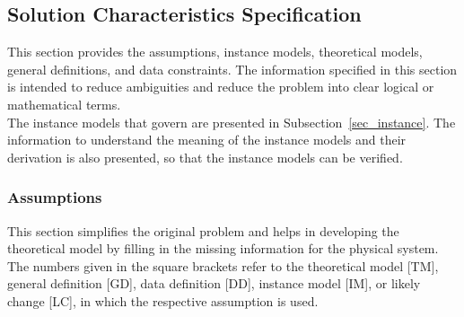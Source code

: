 \documentclass[12pt]{article}
\begin{document}
\subsection{Solution Characteristics Specification}

This section provides the assumptions, instance models, theoretical models, general definitions, and data constraints. The information specified in this section is intended to reduce ambiguities and reduce the problem into clear logical or mathematical terms. \\

The instance models that govern \progname{} are presented in
Subsection~\ref{sec_instance}.  The information to understand the meaning of the
instance models and their derivation is also presented, so that the instance
models can be verified.

\subsubsection{Assumptions} \label{sec_assumpt}

This section simplifies the original problem and helps in developing the
theoretical model by filling in the missing information for the physical
system. The numbers given in the square brackets refer to the theoretical model
[TM], general definition [GD], data definition [DD], instance model [IM], or
likely change [LC], in which the respective assumption is used.
\end{document}
